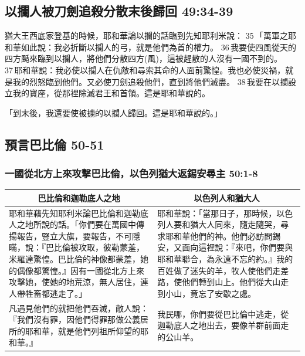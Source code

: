 \subsection{以攔人被刀劍追殺分散末後歸回 49:34-39}
猶大王西底家登基的時候，耶和華論以攔的話臨到先知耶利米說： 35 「萬軍之耶和華如此說：我必折斷以攔人的弓，就是他們為首的權力。 36 我要使四風從天的四方颳來臨到以攔人，將他們分散四方(風)，這被趕散的人沒有一國不到的。 37 耶和華說：我必使以攔人在仇敵和尋索其命的人面前驚惶。我也必使災禍，就是我的烈怒臨到他們。又必使刀劍追殺他們，直到將他們滅盡。 38 我要在以攔設立我的寶座，從那裡除滅君王和首領。這是耶和華說的。

「到末後，我還要使被擄的以攔人歸回。這是耶和華說的。」

\subsection{預言巴比倫 50-51}
\subsubsection{一國從北方上來攻擊巴比倫，以色列猶大返錫安尋主 50:1-8}
\begin{table}[H]
\centering
\begin{tabular}{p{9.45cm}|p{8.0cm}}\hline\hline
\multicolumn{1}{c|}{巴比倫和迦勒底人之地}&\multicolumn{1}{c}{以色列人和猶大人}\\\hline
耶和華藉先知耶利米論巴比倫和迦勒底人之地所說的話。「你們要在萬國中傳揚報告，豎立大旗，要報告，不可隱瞞，說：『巴比倫被攻取，彼勒蒙羞，米羅達驚惶。巴比倫的神像都蒙羞，她的偶像都驚惶。』因有一國從北方上來攻擊她，使她的地荒涼，無人居住，連人帶牲畜都逃走了。」
&耶和華說：「當那日子，那時候，以色列人要和猶大人同來，隨走隨哭，尋求耶和華他們的神。他們必訪問錫安，又面向這裡說：『來吧，你們要與耶和華聯合，為永遠不忘的約。』我的百姓做了迷失的羊，牧人使他們走差路，使他們轉到山上。他們從大山走到小山，竟忘了安歇之處。 \\\hline

凡遇見他們的就把他們吞滅，敵人說：『我們沒有罪，因他們得罪那做公義居所的耶和華，就是他們列祖所仰望的耶和華。』 
&我民哪，你們要從巴比倫中逃走，從迦勒底人之地出去，要像羊群前面走的公山羊。\\\hline
\end{tabular}
\end{table}


